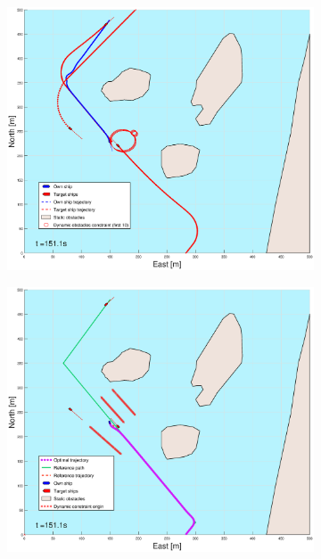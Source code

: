 \begin{figure}[ht]\ContinuedFloat
    \begin{subfigure}[b]{0.49\textwidth}
        \centering
        \includegraphics[width=\textwidth]{Images/Figures/Helloya_Rev/_Simple_1fig1_time=151}
    \end{subfigure}
    \hfill
    \begin{subfigure}[b]{0.499\textwidth}
        \centering
        \includegraphics[width=\textwidth]{Images/Figures/Helloya_Rev/_Simple_1fig999_time=151}

\end{subfigure}
\end{figure}
